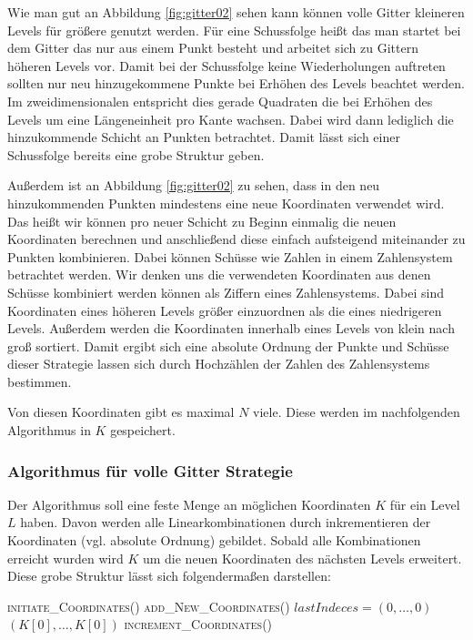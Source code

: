 \documentclass[a4paper,12pt]{llncs}
\numberwithin{equation}{section}
\begin{document}
Wie man gut an Abbildung \ref{fig:gitter02} sehen kann können volle Gitter kleineren Levels für größere genutzt werden. Für eine Schussfolge heißt das man startet bei dem Gitter das nur aus einem Punkt besteht und arbeitet sich zu Gittern höheren Levels vor. Damit bei der Schussfolge keine Wiederholungen auftreten sollten nur neu hinzugekommene Punkte bei Erhöhen des Levels beachtet werden. Im zweidimensionalen entspricht dies gerade Quadraten die bei Erhöhen des Levels um eine Längeneinheit pro Kante wachsen. Dabei wird dann lediglich die hinzukommende Schicht an Punkten betrachtet. Damit lässt sich einer Schussfolge bereits eine grobe Struktur geben. 

Außerdem ist an Abbildung \ref{fig:gitter02} zu sehen, dass in den neu hinzukommenden Punkten mindestens eine neue Koordinaten verwendet wird. Das heißt wir können pro neuer Schicht zu Beginn einmalig die neuen Koordinaten berechnen und anschließend diese einfach aufsteigend miteinander zu Punkten kombinieren. Dabei können Schüsse wie Zahlen in einem Zahlensystem betrachtet werden. Wir denken uns die verwendeten Koordinaten aus denen Schüsse kombiniert werden können als Ziffern eines Zahlensystems. Dabei sind Koordinaten eines höheren Levels größer einzuordnen als die eines niedrigeren Levels. Außerdem werden die Koordinaten innerhalb eines Levels von klein nach groß sortiert. Damit ergibt sich eine absolute Ordnung der Punkte und Schüsse dieser Strategie lassen sich durch Hochzählen der Zahlen des Zahlensystems bestimmen.

Von diesen Koordinaten gibt es maximal $N$ viele. Diese werden im nachfolgenden Algorithmus in $K$ gespeichert.

\subsubsection{Algorithmus für volle Gitter Strategie}

Der Algorithmus soll eine feste Menge an möglichen Koordinaten $K$ für ein Level $L$ haben. Davon werden alle Linearkombinationen durch inkrementieren der Koordinaten (vgl. absolute Ordnung) gebildet. Sobald alle Kombinationen erreicht wurden wird $K$ um die neuen Koordinaten des nächsten Levels erweitert. Diese grobe Struktur lässt sich folgendermaßen darstellen:

\begin{tcolorbox}
	\begin{algorithmic}
		\State \textsc{initiate\_Coordinates}()
		\EndIf
		\State \textsc{add\_New\_Coordinates}()
		\EndIf
		\State $lastIndeces = (0,\dots,0)$
		\State \Return $(K[0],\dots,K[0])$
		\Else
		\State \textsc{increment\_Coordinates}()
		\EndIf
		\EndFunction
	\end{algorithmic}
\end{tcolorbox}
\end{document}
